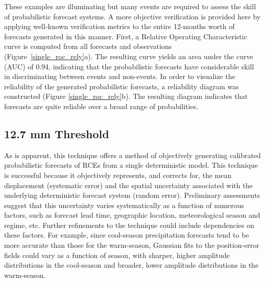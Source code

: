 These examples are illuminating but many events are required to assess the skill of probabilistic forecast systems.
A more objective verification is provided here by applying well-known verification metrics to the entire 12-months worth of forecasts generated in this manner.
First, a Relative Operating Characteristic curve \citep{Mason1982} is computed from all forecasts and observations \mbox{(Figure \ref{single_roc_rely}a)}.
The resulting curve yields an area under the curve (AUC) of 0.94, indicating that the probabilistic forecasts have considerable skill in discriminating between events and non-events.
In order to visualize the reliability of the generated probabilistic forecasts, a reliability diagram was constructed (Figure \mbox{\ref{single_roc_rely}b)}.
The resulting diagram indicates that forecasts are quite reliable over a broad range of probabilities.




\subsection{12.7 mm Threshold}
\label{dresults_12.7mm}





As is apparent, this technique offers a method of objectively generating calibrated probabilistic forecasts of RCEs from a single deterministic model.
This technique is successful because it objectively represents, and corrects for, the mean displacement (systematic error) and the spatial uncertainty associated with the underlying deterministic forecast system (random error).
Preliminary assessments suggest that this uncertainty varies systematically as a function of numerous factors, such as forecast lead time, geographic location, meteorological season and regime, etc.
Further refinements to the technique could include dependencies on these factors.
For example, since cool-season precipitation forecasts tend to be more accurate than those for the warm-season, Gaussian fits to the position-error fields could vary as a function of season, with sharper, higher amplitude distributions in the cool-season and broader, lower amplitude distributions in the warm-season.



